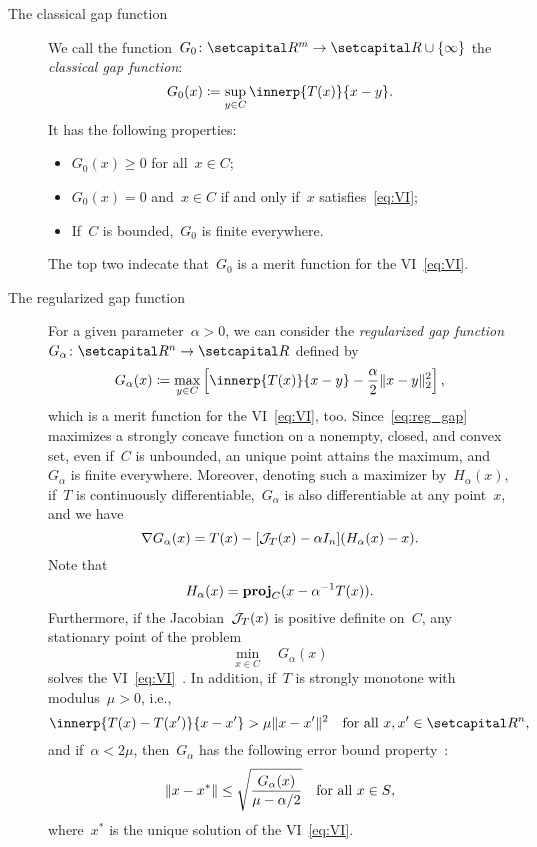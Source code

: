 \documentclass[../../main]{subfiles}
\begin{document}
\begin{example} \label{ex:merit_VI}
    \begin{description}
        \item[The classical gap function~\cite{Auslender1976,Hearn1982}]
            We call the function~$G_0 \colon \setR^m \to \setR \cup \set{\infty}$ the \emph{classical gap function}:
            \[ \label{eq:gap}
                G_0(x) \coloneqq \sup_{y \in C} \innerp{T(x)}{x - y}
            .\] 
            It has the following properties:
            \begin{itemize}
                \item $G_0(x) \ge 0$ for all~$x \in C$;
                \item $G_0(x) = 0$ and~$x \in C$ if and only if~$x$ satisfies~\cref{eq:VI};
                \item If~$C$ is bounded,~$G_0$ is finite everywhere.
            \end{itemize}
            The top two indecate that~$G_0$ is a merit function for the VI~\cref{eq:VI}.
        \item[The regularized gap function~\cite{Fukushima1992,Auchmuty1989}]
            For a given parameter~$\alpha > 0$, we can consider the \emph{regularized gap function}~$G_\alpha \colon \setR^n \to \setR$ defined by
            \[ \label{eq:reg_gap}
                G_\alpha(x) \coloneqq \max_{y \in C} \left[ \innerp{T(x)}{x - y} - \frac{\alpha}{2} \norm{x - y}_2^2 \right] 
            ,\] 
            which is a merit function for the VI~\cref{eq:VI}, too.
            Since~\cref{eq:reg_gap} maximizes a strongly concave function on a nonempty, closed, and convex set, even if~$C$ is unbounded, an unique point attains the maximum, and~$G_\alpha$ is finite everywhere.
            Moreover, denoting such a maximizer by~$H_\alpha(x)$, if~$T$ is continuously differentiable,~$G_\alpha$ is also differentiable at any point~$x$, and we have
            \[
                \nabla G_\alpha(x) = T(x) - [ \mathcal{J}_{T}(x) - \alpha I_n ] (H_\alpha(x) - x)
            .\] 
            Note that
            \[
                H_\alpha(x) = \operatorname{\mathbf{proj}}_C(x - \alpha^{-1} T(x))
            .\] 
            Furthermore, if the Jacobian~$\mathcal{J}_{T}(x)$ is positive definite on~$C$, any stationary point of the problem
            \[
                \min_{x \in C} \quad G_\alpha(x)
            \] 
            solves the VI~\cref{eq:VI}~\cite{Fukushima1992}.
            In addition, if~$T$ is strongly monotone with modulus~$\mu > 0$, i.e.,
            \[
                \innerp{T(x) - T(x')}{x - x'} > \mu \norm{x - x'}^2 \forallcondition{x, x' \in \setR^n}
            ,\]
            and if~$\alpha < 2 \mu$, then~$G_\alpha$ has the following error bound property~\cite{Taji1993}:
            \[
                \lVert x - x^\ast\rVert \le \sqrt{\frac{G_\alpha(x)}{\mu - \alpha / 2}} \quad \text{for all~$x \in S$}
            ,\] 
            where~$x^\ast$ is the unique solution of the VI~\cref{eq:VI}.
    \end{description}
\end{example}
\end{document}
